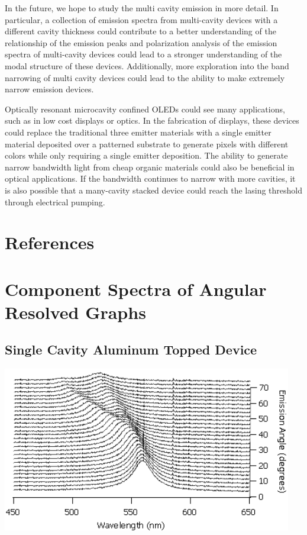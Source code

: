 \documentclass{report}
\begin{document}
    In the future, we hope to study the multi cavity emission in more detail. In particular, a collection of emission spectra from multi-cavity devices with a different cavity thickness could contribute to a better understanding of the relationship of the emission peaks and polarization analysis of the emission spectra of multi-cavity devices could lead to a stronger understanding of the modal structure of these devices. Additionally, more exploration into the band narrowing of multi cavity devices could lead to the ability to make extremely narrow emission devices.
    
    Optically resonant microcavity confined OLEDs could see many applications, such as in low cost displays or optics. In the fabrication of displays, these devices could replace the traditional three emitter materials with a single emitter material deposited over a patterned substrate to generate pixels with different colors while only requiring a single emitter deposition. The ability to generate narrow bandwidth light from cheap organic materials could also be beneficial in optical applications. If the bandwidth continues to narrow with more cavities, it is also possible that a many-cavity stacked device could reach the lasing threshold through electrical pumping.\cite{Baldo2002,Bulovi1998} %
    
\chapter{References}
    \printbibliography[heading=none]

\appendix
\chapter{Component Spectra of Angular Resolved Graphs} \label{components}

    \section*{Single Cavity Aluminum Topped Device}
    \begin{center}
    \includegraphics[width=0.95\textwidth]{images/n1_al_top_waterfall.png}
    \end{center}
    
\end{document}
